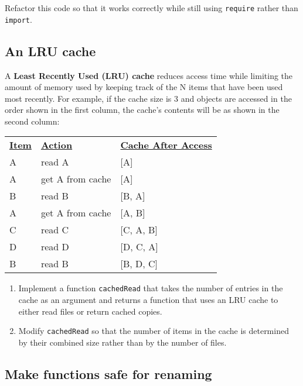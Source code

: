 \documentclass[krantzl]{krantz}
\newcommand{\glossref}[1]{\textbf{#1}}
\begin{document}
\noindent Refactor this code so that it works correctly while still using \texttt{require} rather than \texttt{import}.

\subsection*{An LRU cache}


A \glossref{Least Recently Used (LRU) cache}
reduces access time while limiting the amount of memory used
by keeping track of the N items that have been used most recently.
For example,
if the cache size is 3 and objects are accessed in the order shown in the first column,
the cache’s contents will be as shown in the second column:


\vspace{\baselineskip}
\begin{tabular}{lll}
\textbf{\underline{Item}} & \textbf{\underline{Action}} & \textbf{\underline{Cache After Access}} \\
A & read A & [A] \\
A & get A from cache & [A] \\
B & read B & [B, A] \\
A & get A from cache & [A, B] \\
C & read C & [C, A, B] \\
D & read D & [D, C, A] \\
B & read B & [B, D, C] \\
\end{tabular}

\vspace{\baselineskip}

\begin{enumerate}

\item 

Implement a function \texttt{cachedRead} that takes the number of entries in the cache as an argument
    and returns a function that uses an LRU cache
    to either read files or return cached copies.



\item 

Modify \texttt{cachedRead} so that the number of items in the cache
    is determined by their combined size
    rather than by the number of files.



\end{enumerate}

\subsection*{Make functions safe for renaming}
\end{document}
